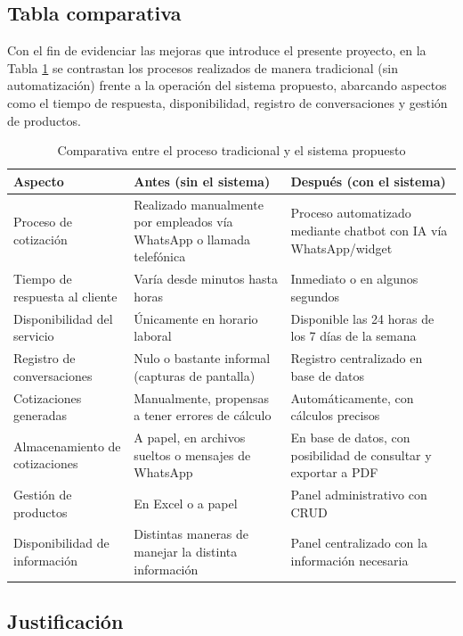 \subsection{Tabla comparativa}
\label{sec:tabla_comparativa}

Con el fin de evidenciar las mejoras que introduce el presente proyecto, en la Tabla \ref{tab:comparativa} se contrastan los procesos realizados de manera tradicional (sin automatización) frente a la operación del sistema propuesto, abarcando aspectos como el tiempo de respuesta, disponibilidad, registro de conversaciones y gestión de productos.

\begin{table}[H]
\centering
\caption{Comparativa entre el proceso tradicional y el sistema propuesto}
\label{tab:comparativa}
\begin{tabular}{|p{3.5cm}|p{5cm}|p{5cm}|}
\hline
\textbf{Aspecto} & \textbf{Antes (sin el sistema)} & \textbf{Después (con el sistema)} \\
\hline
Proceso de cotización & Realizado manualmente por empleados vía WhatsApp o llamada telefónica & Proceso automatizado mediante chatbot con IA vía WhatsApp/widget \\
\hline
Tiempo de respuesta al cliente & Varía desde minutos hasta horas & Inmediato o en algunos segundos \\
\hline
Disponibilidad del servicio & Únicamente en horario laboral & Disponible las 24 horas de los 7 días de la semana \\
\hline
Registro de conversaciones & Nulo o bastante informal (capturas de pantalla) & Registro centralizado en base de datos \\
\hline
Cotizaciones generadas & Manualmente, propensas a tener errores de cálculo & Automáticamente, con cálculos precisos \\
\hline
Almacenamiento de cotizaciones & A papel, en archivos sueltos o mensajes de WhatsApp & En base de datos, con posibilidad de consultar y exportar a PDF \\
\hline
Gestión de productos & En Excel o a papel & Panel administrativo con CRUD \\
\hline
Disponibilidad de información & Distintas maneras de manejar la distinta información & Panel centralizado con la información necesaria \\
\hline
\end{tabular}
\end{table}

\subsection{Justificación}
\label{sec:justificacion}

